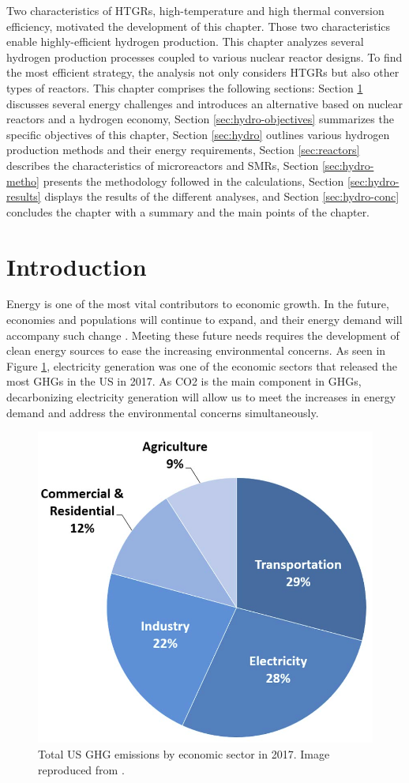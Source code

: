 \label{ch:hydro}

Two characteristics of HTGRs, high-temperature and high thermal conversion efficiency, motivated the development of this chapter.
Those two characteristics enable highly-efficient hydrogen production.
This chapter analyzes several hydrogen production processes coupled to various nuclear reactor designs.
To find the most efficient strategy, the analysis not only considers HTGRs but also other types of reactors.
This chapter comprises the following sections:
Section \ref{sec:hydro-intro} discusses several energy challenges and introduces an alternative based on nuclear reactors and a hydrogen economy,
Section \ref{sec:hydro-objectives} summarizes the specific objectives of this chapter,
Section \ref{sec:hydro} outlines various hydrogen production methods and their energy requirements, 
Section \ref{sec:reactors} describes the characteristics of microreactors and \glspl{SMR},
Section \ref{sec:hydro-metho} presents the methodology followed in the calculations, 
Section \ref{sec:hydro-results} displays the results of the different analyses,
and Section \ref{sec:hydro-conc} concludes the chapter with a summary and the main points of the chapter.

\section{Introduction}
\label{sec:hydro-intro}

Energy is one of the most vital contributors to economic growth.
In the future, economies and populations will continue to expand, and their energy demand will accompany such change \cite{burke_impact_2018} \cite{el-shafie_hydrogen_2019}.
Meeting these future needs requires the development of clean energy sources to ease the increasing environmental concerns.
As seen in Figure \ref{fig:ghg}, electricity generation was one of the economic sectors that released the most \glspl{GHG} in the \gls{US} in 2017.
As \gls{CO2} is the main component in \glspl{GHG}, decarbonizing electricity generation will allow us to meet the increases in energy demand and address the environmental concerns simultaneously.

\begin{figure}[htbp!]
	\centering
	\includegraphics[width=0.4\linewidth]{figures-hydro/total-ghg-2017.png}
	\hfill
	\caption{Total US GHG emissions by economic sector in 2017. Image reproduced from \cite{us_epa_sources_2020}.}
	\label{fig:ghg}
\end{figure}

